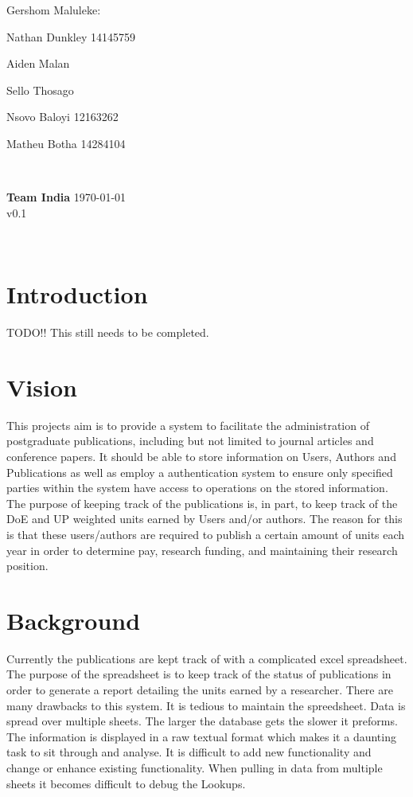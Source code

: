 \documentclass{article}
\newcommand{\tab}[1]{\hspace{.1\textwidth}\rlap{#1}}
\begin{document}
\begin{titlepage}
\begin{minipage}{0.5\textwidth}
\begin{flushleft}
	Gershom Maluleke:\tab{13229908}


	Nathan Dunkley 14145759

	Aiden Malan

	Sello Thosago

	Nsovo Baloyi 12163262

	Matheu Botha 14284104
	\end{flushleft}
	\end{minipage}
	~
	\begin{minipage}{0.4\textwidth}
	\begin{flushright} \large
	{ \huge \bfseries Team India }%
	{\large \today}\\
	{\large v0.1}
	\end{flushright}
	\end{minipage}\\[4cm]
\end{titlepage}


	\newpage
	
	\section{Introduction}
	
	TODO!! This still needs to be completed.

	\section{Vision}

	This projects aim is to provide a system to facilitate the administration of postgraduate publications, including but not limited to journal articles and conference papers. It should be able to store information on Users, Authors and Publications as well as employ a authentication system to ensure only specified parties within the system have access to operations on the stored information.
	The purpose of keeping track of the publications is, in part, to keep track of the DoE and UP weighted units earned by Users and/or authors. The reason for this is that these users/authors are required to publish a certain amount of units each year in order to determine pay, research funding, and maintaining their research position.

	\section{Background}
	Currently the publications are kept track of with a complicated excel spreadsheet. The purpose of the spreadsheet is to keep track of the status of publications in order to generate a report detailing the units earned by a researcher. There are many drawbacks to this system. It is tedious to maintain the spreedsheet. Data is spread over multiple sheets. The larger the database gets the slower it preforms. The information is displayed in a raw textual format which makes it a daunting task to sit through and analyse. It is difficult to add new functionality and change or enhance existing functionality. When pulling in data from multiple sheets it becomes difficult to debug the Lookups.
\end{document}
